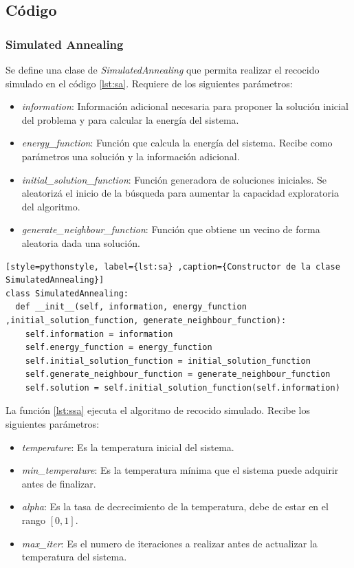 \documentclass[12pt,twoside]{article}
\begin{document}
	\clearpage
	\subsection{Código}
		
	\subsubsection{Simulated Annealing}
	
	Se define una clase de \textit{SimulatedAnnealing} que permita realizar el recocido simulado en el código \ref{lst:sa}. Requiere de los siguientes parámetros:
	\begin{itemize}
		\item \textit{information}: Información adicional necesaria para proponer la solución inicial del problema y para calcular la energía del sistema.
		\item \textit{energy\_function}: Función que calcula la energía del sistema. Recibe como parámetros una solución y la información adicional.
		\item \textit{initial\_solution\_function}: Función generadora de soluciones iniciales. Se aleatorizá el inicio de la búsqueda para aumentar la capacidad exploratoria del algoritmo.
		\item \textit{generate\_neighbour\_function}: Función que obtiene un vecino de forma aleatoria dada una solución.
	\end{itemize}
		
\begin{lstlisting}[style=pythonstyle, label={lst:sa} ,caption={Constructor de la clase SimulatedAnnealing}]
class SimulatedAnnealing:
  def __init__(self, information, energy_function ,initial_solution_function, generate_neighbour_function):
    self.information = information
	self.energy_function = energy_function
	self.initial_solution_function = initial_solution_function
	self.generate_neighbour_function = generate_neighbour_function
	self.solution = self.initial_solution_function(self.information)
\end{lstlisting}
	
	La función \ref{lst:ssa} ejecuta el algoritmo de recocido simulado. Recibe los siguientes parámetros:
	\begin{itemize}
		\item \textit{temperature}: Es la temperatura inicial del sistema.
		\item \textit{min\_temperature}: Es la temperatura mínima que el sistema puede adquirir antes de finalizar.
		\item \textit{alpha}: Es la tasa de decrecimiento de la temperatura, debe de estar en el rango $[0, 1]$.
		\item \textit{max\_iter}: Es el numero de iteraciones a realizar antes de actualizar la temperatura del sistema.
	\end{itemize}
	
\end{document}
